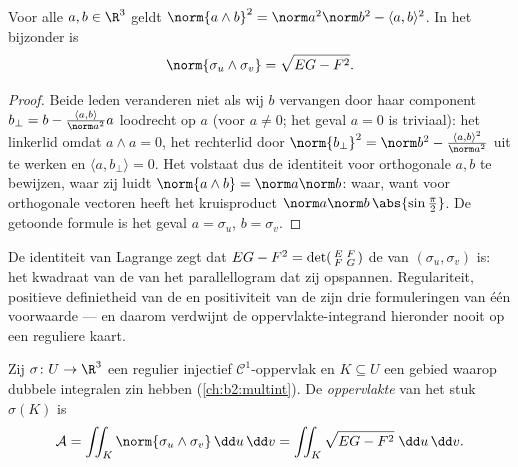 \begin{lemma}\label{lem:b2:surfaces:lagrange}
Voor alle $a, b \in \R^3$ geldt $\norm{a \wedge b}^2 = \norm a^2
\norm b^2 - \langle a, b\rangle^2$. In het bijzonder is
\[
\norm{\sigma_u \wedge \sigma_v} = \sqrt{EG - F^2}.
\]
\end{lemma}

\begin{proof}
Beide leden veranderen niet als wij $b$ vervangen door haar
component $b_\perp = b - \frac{\langle a, b\rangle}{\norm a^2}a$
loodrecht op $a$ (voor $a \neq 0$; het geval $a = 0$ is triviaal):
het linkerlid omdat $a \wedge a = 0$, het rechterlid door
$\norm{b_\perp}^2 = \norm b^2 - \frac{\langle a,b\rangle^2}{\norm
a^2}$ uit te werken en $\langle a, b_\perp\rangle = 0$. Het
volstaat dus de identiteit voor orthogonale $a, b$ te bewijzen,
waar zij luidt $\norm{a \wedge b} = \norm a \norm b$: waar, want
voor orthogonale vectoren heeft het kruisproduct  $\norm
a\norm b\,\abs{\sin\frac\pi2}$. De getoonde formule is het geval $a
= \sigma_u$, $b = \sigma_v$.
\end{proof}

\begin{remark}
De identiteit van Lagrange zegt dat $EG - F^2 =
\det\begin{psmallmatrix} E & F\\ F & G\end{psmallmatrix}$ de
\emph{} van $(\sigma_u, \sigma_v)$ is: het kwadraat
van de  van het parallellogram dat zij opspannen.
Regulariteit, positieve definietheid van de  en positiviteit van de  zijn drie
formuleringen van één voorwaarde --- en daarom verdwijnt de
oppervlakte-integrand hieronder nooit op een reguliere kaart.
\end{remark}

\begin{definition}[Oppervlakte]\label{def:b2:surfaces:area}
Zij $\sigma \colon U \to \R^3$ een regulier injectief
$\mathcal{C}^1$-oppervlak en $K \subseteq U$ een  gebied
waarop dubbele integralen zin hebben (\cref{ch:b2:multint}). De
\emph{oppervlakte} van het
stuk $\sigma(K)$ is
\[
\mathcal{A}
= \iint_K \norm{\sigma_u \wedge \sigma_v}\,\dd u\,\dd v
= \iint_K \sqrt{EG - F^2}\;\dd u\,\dd v .
\]
\end{definition}

